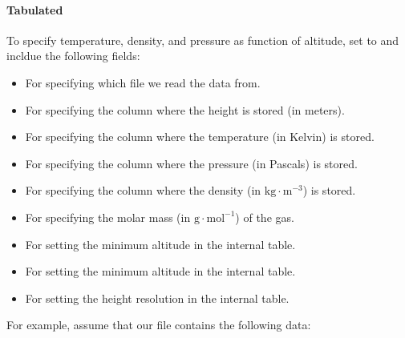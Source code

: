 \documentclass[letterpaper,10pt,english]{sphinxmanual}
\begin{document}
\paragraph{Tabulated}
\label{\detokenize{Applications/CdrPlasmaModel:tabulated}}
To specify temperature, density, and pressure as function of altitude, set  to  and incldue the following fields:
\begin{itemize}
\item {} 
 For specifying which file we read the data from.

\item {} 
 For specifying the column where the height is stored (in meters).

\item {} 
 For specifying the column where the temperature (in Kelvin) is stored.

\item {} 
 For specifying the column where the pressure (in Pascals) is stored.

\item {} 
 For specifying the column where the density (in \(\textrm{kg}\cdot\textrm{m}^{-3}\)) is stored.

\item {} 
 For specifying the molar mass (in \(\textrm{g}\cdot\textrm{mol}^{-1}\)) of the gas.

\item {} 
 For setting the minimum altitude in the  internal table.

\item {} 
 For setting the minimum altitude in the  internal table.

\item {} 
 For setting the height resolution in the  internal table.

\end{itemize}

For example, assume that our file  contains the following data:
\end{document}
